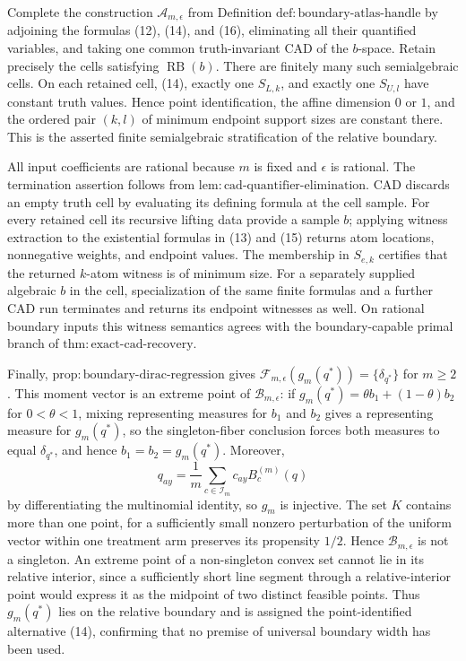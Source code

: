Complete the construction \(\mathcal A_{m,\epsilon}\) from Definition \(\mathrm{def{:}boundary\text{-}atlas\text{-}handle}\) by adjoining the formulas (12), (14), and (16), eliminating all their quantified variables, and taking one common truth-invariant CAD of the \(b\)-space.  Retain precisely the cells satisfying \(\operatorname{RB}(b)\).  There are finitely many such semialgebraic cells.  On each retained cell, (14), exactly one \(S_{L,k}\), and exactly one \(S_{U,l}\) have constant truth values.  Hence point identification, the affine dimension \(0\) or \(1\), and the ordered pair \((k,l)\) of minimum endpoint support sizes are constant there.  This is the asserted finite semialgebraic stratification of the relative boundary.

All input coefficients are rational because \(m\) is fixed and \(\epsilon\) is rational.  The termination assertion follows from \(\mathrm{lem{:}cad\text{-}quantifier\text{-}elimination}\).  CAD discards an empty truth cell by evaluating its defining formula at the cell sample.  For every retained cell its recursive lifting data provide a sample \(b\); applying witness extraction to the existential formulas in (13) and (15) returns atom locations, nonnegative weights, and endpoint values.  The membership in \(S_{e,k}\) certifies that the returned \(k\)-atom witness is of minimum size.  For a separately supplied algebraic \(b\) in the cell, specialization of the same finite formulas and a further CAD run terminates and returns its endpoint witnesses as well.  On rational boundary inputs this witness semantics agrees with the boundary-capable primal branch of \(\mathrm{thm{:}exact\text{-}cad\text{-}recovery}\).

Finally, \(\mathrm{prop{:}boundary\text{-}dirac\text{-}regression}\) gives \(\mathcal F_{m,\epsilon}(g_m(q^*))=\{\delta_{q^*}\}\) for \(m\geq2\).  This moment vector is an extreme point of \(\mathcal B_{m,\epsilon}\): if \(g_m(q^*)=\theta b_1+(1-\theta)b_2\) for \(0<\theta<1\), mixing representing measures for \(b_1\) and \(b_2\) gives a representing measure for \(g_m(q^*)\), so the singleton-fiber conclusion forces both measures to equal \(\delta_{q^*}\), and hence \(b_1=b_2=g_m(q^*)\).  Moreover,
\[
q_{ay}=\frac1m\sum_{c\in\mathcal I_m}c_{ay}B_c^{(m)}(q)
\tag{17}
\]
by differentiating the multinomial identity, so \(g_m\) is injective.  The set \(K\) contains more than one point, for a sufficiently small nonzero perturbation of the uniform vector within one treatment arm preserves its propensity \(1/2\).  Hence \(\mathcal B_{m,\epsilon}\) is not a singleton.  An extreme point of a non-singleton convex set cannot lie in its relative interior, since a sufficiently short line segment through a relative-interior point would express it as the midpoint of two distinct feasible points.  Thus \(g_m(q^*)\) lies on the relative boundary and is assigned the point-identified alternative (14), confirming that no premise of universal boundary width has been used.